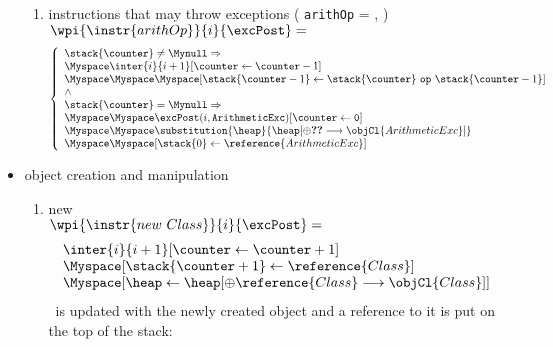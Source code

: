 \begin{itemize}
\begin{enumerate}
		\item instructions that may throw exceptions ( \texttt{arithOp} =  ,  )\\
				$\wpi{\instr{arithOp } } {i} {\excPost}  =$
				$$\left\{
				\begin{array}{l}
				 \stack{\counter} \neq \Mynull \Rightarrow \\
				  \Myspace  \inter{i}{i+1} [\counter \leftarrow \counter   - 1] \\
				\Myspace \Myspace  \Myspace    	[ \stack{\counter - 1} \leftarrow  \stack{\counter} \ \texttt{op}  \ \stack{\counter -1}] \\
				\wedge \\
				\stack{\counter} = \Mynull \Rightarrow  \\
				\Myspace \Myspace  \excPost(i,\tt{ArithmeticExc})[\counter \leftarrow 0] \\
				\Myspace \Myspace \substitution{\heap}{\heap[\oplus \Ref{ArithmeticExc } \longrightarrow \objCl{ArithmeticExc}]}\\
				
				\Myspace \Myspace    [ \stack{0} \leftarrow  \reference{ArithmeticExc}] \\
				\end{array} \right.
				$$
	\end{enumerate}
				
		
\item  object creation and manipulation 
	\begin{enumerate}
		\item new \\
		$\wpi{\instr{new  \ Class}} {i} {\excPost}  = $ \\
		$$ \begin{array}{l} 
		\inter{i}{i+1} [ \counter \leftarrow \counter + 1 ] \\
		\Myspace [ \stack{ \counter + 1} \leftarrow \reference{Class}  ] \\
		\Myspace [ \heap  \leftarrow \heap[\oplus  \reference{Class} \longrightarrow \objCl{Class} ]]
		\end{array}
		$$
		\heap \ is updated with the newly created object and a reference to it is put on the top of the stack: \\
	

\end{enumerate}
\end{itemize}
